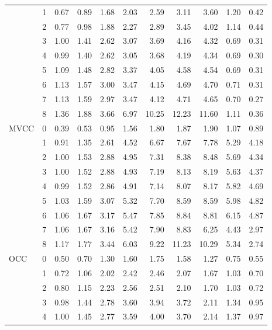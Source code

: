 \begin{tabular}{llrrrrrrrrr}
       & 1 & 0.67 & 0.89 & 1.68 & 2.03 &  2.59 &  3.11 &  3.60 & 1.20 & 0.42 \\
       & 2 & 0.77 & 0.98 & 1.88 & 2.27 &  2.89 &  3.45 &  4.02 & 1.14 & 0.44 \\
       & 3 & 1.00 & 1.41 & 2.62 & 3.07 &  3.69 &  4.16 &  4.32 & 0.69 & 0.31 \\
       & 4 & 0.99 & 1.40 & 2.62 & 3.05 &  3.68 &  4.19 &  4.34 & 0.69 & 0.30 \\
       & 5 & 1.09 & 1.48 & 2.82 & 3.37 &  4.05 &  4.58 &  4.54 & 0.69 & 0.31 \\
       & 6 & 1.13 & 1.57 & 3.00 & 3.47 &  4.15 &  4.69 &  4.70 & 0.71 & 0.31 \\
       & 7 & 1.13 & 1.59 & 2.97 & 3.47 &  4.12 &  4.71 &  4.65 & 0.70 & 0.27 \\
       & 8 & 1.36 & 1.88 & 3.66 & 6.97 & 10.25 & 12.23 & 11.60 & 1.11 & 0.36 \\
MVCC & 0 & 0.39 & 0.53 & 0.95 & 1.56 &  1.80 &  1.87 &  1.90 & 1.07 & 0.89 \\
       & 1 & 0.91 & 1.35 & 2.61 & 4.52 &  6.67 &  7.67 &  7.78 & 5.29 & 4.18 \\
       & 2 & 1.00 & 1.53 & 2.88 & 4.95 &  7.31 &  8.38 &  8.48 & 5.69 & 4.34 \\
       & 3 & 1.00 & 1.52 & 2.88 & 4.93 &  7.19 &  8.13 &  8.19 & 5.63 & 4.37 \\
       & 4 & 0.99 & 1.52 & 2.86 & 4.91 &  7.14 &  8.07 &  8.17 & 5.82 & 4.69 \\
       & 5 & 1.03 & 1.59 & 3.07 & 5.32 &  7.70 &  8.59 &  8.59 & 5.98 & 4.82 \\
       & 6 & 1.06 & 1.67 & 3.17 & 5.47 &  7.85 &  8.84 &  8.81 & 6.15 & 4.87 \\
       & 7 & 1.06 & 1.67 & 3.16 & 5.42 &  7.90 &  8.83 &  6.25 & 4.43 & 2.97 \\
       & 8 & 1.17 & 1.77 & 3.44 & 6.03 &  9.22 & 11.23 & 10.29 & 5.34 & 2.74 \\
OCC & 0 & 0.50 & 0.70 & 1.30 & 1.60 &  1.75 &  1.58 &  1.27 & 0.75 & 0.55 \\
       & 1 & 0.72 & 1.06 & 2.02 & 2.42 &  2.46 &  2.07 &  1.67 & 1.03 & 0.70 \\
       & 2 & 0.80 & 1.15 & 2.23 & 2.56 &  2.51 &  2.10 &  1.70 & 1.03 & 0.72 \\
       & 3 & 0.98 & 1.44 & 2.78 & 3.60 &  3.94 &  3.72 &  2.11 & 1.34 & 0.95 \\
       & 4 & 1.00 & 1.45 & 2.77 & 3.59 &  4.00 &  3.70 &  2.14 & 1.37 & 0.97 \\

\end{tabular}
